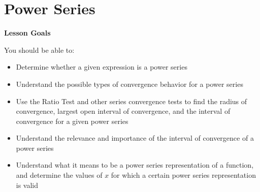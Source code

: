 \documentclass[main]{subfiles}
\begin{document}
\ifSubfilesClassLoaded{%
  \chaptermark{\chaptertwo}
}{}

\section{Power Series} \label{ws2-11}
\begin{framed}
\centerline{\textbf{Lesson Goals}}

You should be able to:
\begin{itemize}
\item Determine whether a given expression is a power series
\item Understand the possible types of convergence behavior for a power series
\item Use the Ratio Test and other series convergence tests to find the radius of convergence, largest open interval of convergence, and the interval of convergence for a given power series
\item Understand the relevance and importance of the interval of convergence of a power series
\item Understand what it means to be a power series representation of a function, and determine the values of $x$ for which a certain power series representation is valid
\end{itemize}
\end{framed}    
\end{document}
